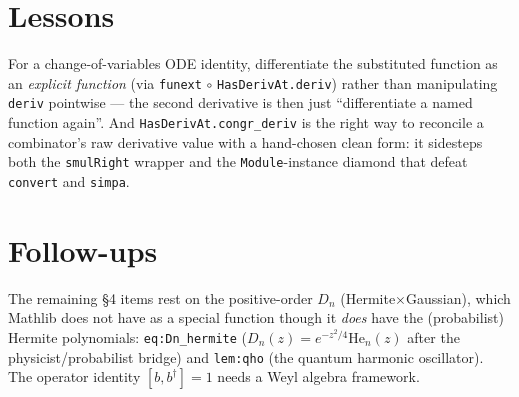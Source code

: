\documentclass[11pt]{article}
\begin{document}
\section{Lessons}
For a change-of-variables ODE identity, differentiate the substituted function as an \emph{explicit
function} (via \texttt{funext}$\,\circ\,$\texttt{HasDerivAt.deriv}) rather than manipulating
\texttt{deriv} pointwise --- the second derivative is then just ``differentiate a named function
again''. And \texttt{HasDerivAt.congr\_deriv} is the right way to reconcile a combinator's raw
derivative value with a hand-chosen clean form: it sidesteps both the \texttt{smulRight} wrapper and the
\texttt{Module}-instance diamond that defeat \texttt{convert} and \texttt{simpa}.

\section{Follow-ups}
The remaining \S4 items rest on the positive-order $D_n$ (Hermite$\times$Gaussian), which Mathlib does
not have as a special function though it \emph{does} have the (probabilist) Hermite polynomials:
\texttt{eq:Dn\_hermite} ($D_n(z)=e^{-z^2/4}\mathrm{He}_n(z)$ after the physicist/probabilist bridge) and
\texttt{lem:qho} (the quantum harmonic oscillator). The operator identity $[b,b^\dagger]=1$ needs a Weyl
algebra framework.
\end{document}
